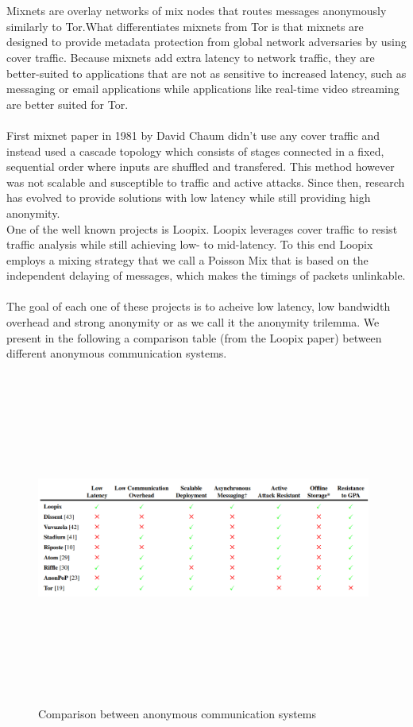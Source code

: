 \\~\\Mixnets are overlay networks of mix nodes that routes messages anonymously similarly to Tor.What differentiates mixnets from Tor is that mixnets are designed to provide metadata protection from global network adversaries by using cover traffic. Because mixnets add extra latency to network traffic, they are better-suited to applications that are not as sensitive to increased latency, such as messaging or email applications while applications like real-time video streaming are better suited for Tor. 
\\~\\First mixnet paper in 1981 by David Chaum didn't use any cover traffic and instead used a cascade topology which consists of stages connected in a fixed, sequential order where inputs are shuffled and transfered. This method however was not scalable and susceptible to traffic and active attacks. Since then, research has evolved to provide solutions with low latency while still providing high anonymity.
\\ One of the well known projects is Loopix. Loopix leverages cover traffic to resist traffic analysis while still achieving low- to mid-latency. To this end Loopix employs a mixing strategy that we call a Poisson Mix that is based on the independent delaying of messages, which makes the timings of packets unlinkable.
\\~\\ The goal of each one of these projects is to acheive low latency, low bandwidth overhead and strong anonymity or as we call it the anonymity trilemma. We present in the following a comparison table (from the Loopix paper) between different anonymous communication systems.

\begin{figure}[H]
    \centering
    \includegraphics[width=11cm,height=11cm,keepaspectratio]{../whitepaper/images/state-of-the-art.png}
    \caption{Comparison between anonymous communication systems}
    \label{fig:Comparison between anonymous communication systems}
\end{figure}


